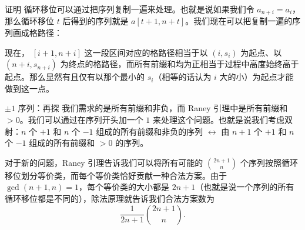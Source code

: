 \begin{frame}{证明}
    循环移位可以通过把序列复制一遍来处理。也就是说如果我们令 $a_{n+i}=a_i$，那么循环移位 $t$ 后得到的序列就是 $a[t+1,n+t]$。我们现在可以把复制一遍的序列画成格路径：
    \begin{center}
    \end{center}
    现在， $[i+1,n+i]$ 这一段区间对应的格路径相当于以 $(i,s_i)$ 为起点、以 $(n+i,s_{n+i})$ 为终点的格路径，而所有前缀和均为正相当于过程中高度始终高于起点。那么显然有且仅有以那个最小的 $s_i$（相等的话认为 $i$ 大的小）为起点才能做到这一点。
\end{frame}
\begin{frame}{$\pm 1$ 序列：再探}
    我们需求的是所有前缀和非负，而 Raney 引理中是所有前缀和 $>0$。我们可以通过在序列开头加一个 $1$ 来处理这个问题。也就是说我们考虑双射：$n$ 个 $+1$ 和 $n$ 个 $-1$ 组成的所有前缀和非负的序列 $\leftrightarrow$ 由 $n+1$ 个 $+1$ 和 $n$ 个 $-1$ 组成的所有前缀和 $>0$ 的序列。

    对于新的问题，Raney 引理告诉我们可以将所有可能的 $\binom{2n+1}{n}$ 个序列按照循环移位划分等价类，而每个等价类恰好贡献一种合法方案。由于 $\gcd(n+1,n)=1$，每个等价类的大小都是 $2n+1$（也就是说一个序列的所有循环移位都是不同的），除法原理就告诉我们合法方案数为
    $$
    \frac{1}{2n+1}\binom{2n+1}{n}.
    $$
\end{frame}
